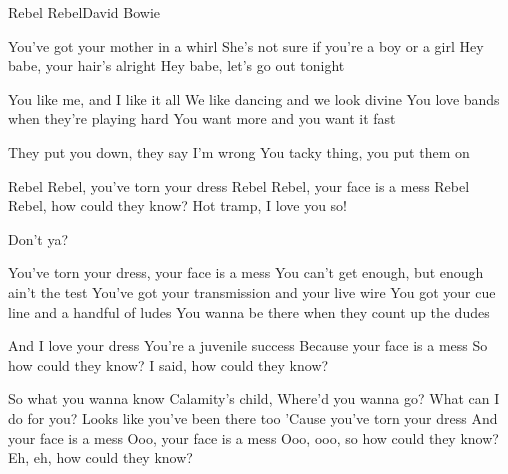 \documentclass[a4paper,11pt,french]{article}
\begin{document}

\begin{Song}{Rebel Rebel}{David Bowie}
\begin{multicols}{2}

\begin{Verse}
You've got your mother in a whirl 
She's not sure if you're a boy or a girl
Hey babe, your hair's alright
Hey babe, let's go out tonight
\espaceInterStrophe

You like me, and I like it all
We like dancing and we look divine
You love bands when they're playing hard
You want more and you want it fast
\end{Verse}
\espaceInterStrophe

\begin{PreChorus}
They put you down, they say I'm wrong
You tacky thing, you put them on
\end{PreChorus}
\espaceInterStrophe

\begin{Chorus}
Rebel Rebel, you've torn your dress
Rebel Rebel, your face is a mess
Rebel Rebel, how could they know?
Hot tramp, I love you so!

Don't ya?
\end{Chorus}
\espaceInterStrophe

\espaceInterStrophe

\tochorus[x2]
\columnbreak

\begin{Verse}
You've torn your dress, your face is a mess
You can't get enough, but enough ain't the test
You've got your transmission and your live wire
You got your cue line and a handful of ludes
You wanna be there when they count up the dudes
\espaceInterStrophe

And I love your dress
You're a juvenile success
Because your face is a mess
So how could they know?
I said, how could they know?
\espaceInterStrophe

So what you wanna know Calamity's child, 
Where'd you wanna go?
What can I do for you? Looks like you've been there too
'Cause you've torn your dress
And your face is a mess
Ooo, your face is a mess
Ooo, ooo, so how could they know?
Eh, eh, how could they know?
\end{Verse}
\espaceInterStrophe

\vfill
~
\end{multicols}

\vfill


\end{Song}
\end{document}

